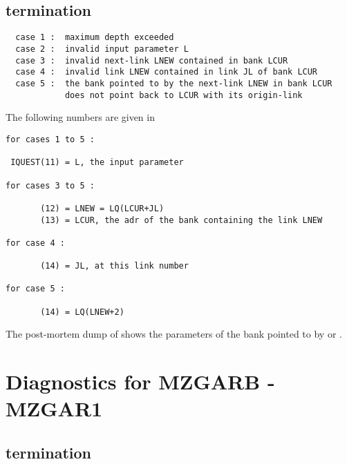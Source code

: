 \begin{flushleft}
\\
\\
\end{flushleft}

\subsection*{ termination}

\begin{verbatim}
  case 1 :  maximum depth exceeded
  case 2 :  invalid input parameter L
  case 3 :  invalid next-link LNEW contained in bank LCUR
  case 4 :  invalid link LNEW contained in link JL of bank LCUR
  case 5 :  the bank pointed to by the next-link LNEW in bank LCUR
            does not point back to LCUR with its origin-link
\end{verbatim}

The following numbers are given in 

\begin{verbatim}
for cases 1 to 5 :

 IQUEST(11) = L, the input parameter

for cases 3 to 5 :

       (12) = LNEW = LQ(LCUR+JL)
       (13) = LCUR, the adr of the bank containing the link LNEW

for case 4 :

       (14) = JL, at this link number

for case 5 :

       (14) = LQ(LNEW+2)
\end{verbatim}

The post-mortem dump of  
shows the parameters of the bank
pointed to by  or .

\section{Diagnostics for MZGARB - MZGAR1}


\subsection*{ termination}

